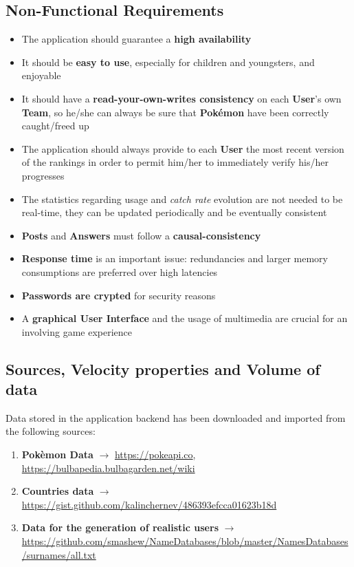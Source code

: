 \subsection{Non-Functional Requirements}
\begin{itemize}
	\item The application should guarantee a \textbf{high availability}
	\item It should be \textbf{easy to use}, especially for children and youngsters, and enjoyable
	\item It should have a \textbf{read-your-own-writes consistency} on each \textbf{User}’s own \textbf{Team}, so he/she can always be sure that \textbf{Pokémon} have been correctly caught/freed up
	\item The application should always provide to each \textbf{User} the most recent version of the rankings in order to permit him/her to immediately verify his/her progresses
	\item The statistics regarding usage and \textit{catch rate} evolution are not needed to be real-time, they can be updated periodically and be eventually consistent
	\item \textbf{Posts} and \textbf{Answers} must follow a \textbf{causal-consistency}
	\item \textbf{Response time} is an important issue: redundancies and larger memory consumptions are preferred over high latencies
	\item \textbf{Passwords are crypted} for security reasons
	\item A \textbf{graphical User Interface} and the usage of multimedia are crucial for an involving game experience 
\end{itemize}
\subsection{Sources, Velocity properties and Volume of data}
Data stored in the application backend has been downloaded and imported from the following sources:
\begin{enumerate}
	\item \textbf{Pokèmon Data} $\rightarrow$ \url{https://pokeapi.co},\\ \url{https://bulbapedia.bulbagarden.net/wiki} 
	\item \textbf{Countries data} $\rightarrow$ \url{https://gist.github.com/kalinchernev/486393efcca01623b18d}
	\item \textbf{Data for the generation of realistic users} $\rightarrow$  \url{https://github.com/smashew/NameDatabases/blob/master/NamesDatabases/surnames/all.txt}
\end{enumerate}

